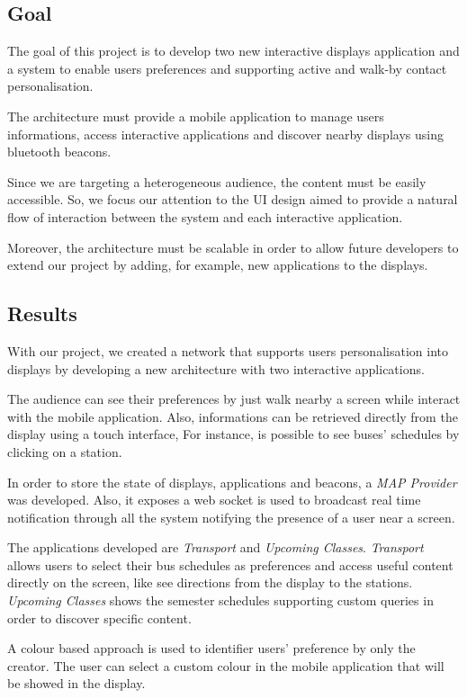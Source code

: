\documentclass[]{usiinfbachelorproject}
\begin{document}
\subsection{Goal}
The goal of this project is to develop two new interactive displays application and a system to enable users preferences and supporting active and walk-by contact personalisation.

The architecture must provide a mobile application to manage users informations, access interactive applications and discover nearby displays using bluetooth beacons.

Since we are targeting a heterogeneous audience, the content must be easily accessible. So, we focus our attention to the UI design aimed to provide a natural flow of interaction between the system and each interactive application.

Moreover, the architecture must be scalable in order to allow future developers to extend our project by adding, for example, new applications to the displays. 

\subsection{Results}
With our project, we created a network that supports users personalisation into displays by developing a new architecture with two interactive applications.

The audience can see their preferences by just walk nearby a screen while interact with the mobile application. Also, informations can be retrieved directly from the display using a touch interface, For instance, is possible to see buses' schedules by clicking on a station.

In order to store the state of displays, applications and beacons, a \emph{MAP Provider} was developed. Also, it exposes a web socket is used to broadcast real time notification through all the system notifying the presence of a user near a screen.

The applications developed are \emph{Transport} and \emph{Upcoming Classes}. \emph{Transport} allows users to select their bus schedules as preferences and access useful content directly on the screen, like see directions from the display to the stations.
\emph{Upcoming Classes} shows the semester schedules supporting custom queries in order to discover specific content.

A colour based approach is used to identifier users' preference by only the creator. The user can select a custom colour in the mobile application that will be showed in the display.
\end{document}
